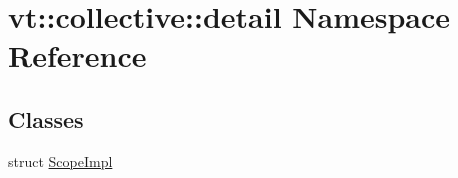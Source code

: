 \hypertarget{namespacevt_1_1collective_1_1detail}{}\section{vt\+:\+:collective\+:\+:detail Namespace Reference}
\label{namespacevt_1_1collective_1_1detail}
\subsection*{Classes}
\begin{DoxyCompactItemize}
\item 
struct \hyperlink{structvt_1_1collective_1_1detail_1_1_scope_impl}{Scope\+Impl}
\end{DoxyCompactItemize}

